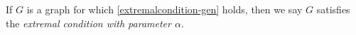 \documentclass[oneside,12pt]{memoir}
\newtheorem{lemma}[theorem]{Lemma}
\newtheorem{fact}[theorem]{Fact}
\newtheorem{definition}[theorem]{Definition}
\newcommand{\ep}{\epsilon}
\begin{document}
If $G$ is a graph for which \eqref{extremalcondition-gen} holds, then we say $G$ satisfies the \emph{extremal condition with parameter $\alpha$}.
% 
% 
% 
% 
% 
% 
% 
% 
% 
\end{document}
